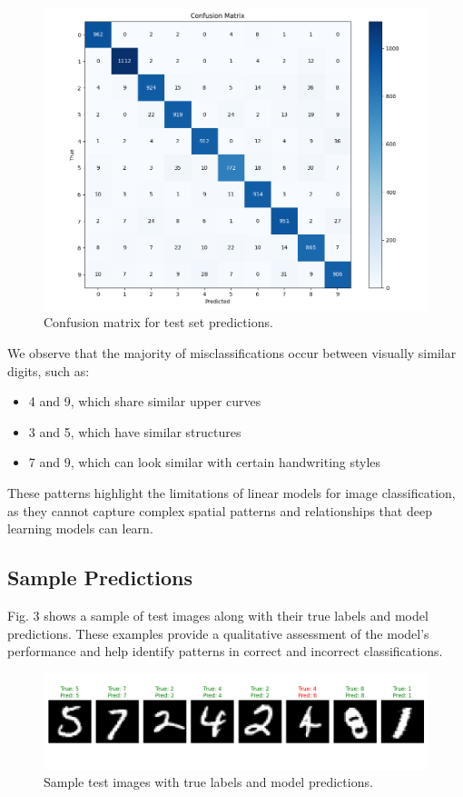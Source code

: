 \documentclass[10pt,journal,compsoc]{IEEEtran}
\begin{document}
\begin{figure}[htbp]
\centering
\includegraphics[width=0.8\linewidth]{img/confusionmatrix.png}
\caption{Confusion matrix for test set predictions.}
\label{fig:confusion_matrix}
\end{figure}

We observe that the majority of misclassifications occur between visually similar digits, such as:
\begin{itemize}
    \item 4 and 9, which share similar upper curves
    \item 3 and 5, which have similar structures
    \item 7 and 9, which can look similar with certain handwriting styles
\end{itemize}

These patterns highlight the limitations of linear models for image classification, as they cannot capture complex spatial patterns and relationships that deep learning models can learn.

\subsection{Sample Predictions}
Fig. 3 shows a sample of test images along with their true labels and model predictions. These examples provide a qualitative assessment of the model's performance and help identify patterns in correct and incorrect classifications.

\begin{figure}[htbp]
\centering
\includegraphics[width=0.8\linewidth]{img/output.png}
\caption{Sample test images with true labels and model predictions.}
\label{fig:sample_predictions}
\end{figure}
\end{document}
